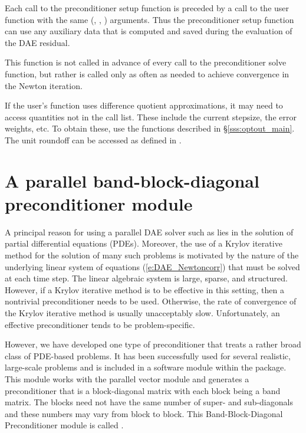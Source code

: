 {{  Each call to the preconditioner setup function is preceded by a call to the
   user function with the same (, , ) arguments.  
  Thus the preconditioner setup function can use any auxiliary data that is 
  computed and saved during the evaluation of the DAE residual.
  
  This function is not called in advance of every call to the preconditioner solve
  function, but rather is called only as often as needed to achieve convergence in
  the Newton iteration.

  If the user's  function uses difference quotient
  approximations, it may need to access quantities not in the call
  list. These include the current stepsize, the error weights, etc.
  To obtain these, use the  functions described in
  \S\ref{sss:optout_main}. The unit roundoff can be accessed
  as  defined in .

}


\section{A parallel band-block-diagonal preconditioner module}\label{sss:idabbdpre}

A principal reason for using a parallel DAE solver such as {\ida} lies
in the solution of partial differential equations (PDEs).  Moreover,
the use of a Krylov iterative method for the solution of many such
problems is motivated by the nature of the underlying linear system of
equations (\ref{e:DAE_Newtoncorr}) that must be solved at each time step.  The
linear algebraic system is large, sparse, and structured. However, if
a Krylov iterative method is to be effective in this setting, then a
nontrivial preconditioner needs to be used.  Otherwise, the rate of
convergence of the Krylov iterative method is usually unacceptably
slow.  Unfortunately, an effective preconditioner tends to be
problem-specific.

However, we have developed one type of preconditioner that treats a
rather broad class of PDE-based problems.  It has been successfully
used for several realistic, large-scale problems \cite{HiTa:98} and is
included in a software module within the {\ida} package. This module
works with the parallel vector module {\nvecp} and 
generates a preconditioner that is a block-diagonal matrix with each
block being a band matrix. The blocks need not have the same number of
super- and sub-diagonals and these numbers may vary from block to
block. This Band-Block-Diagonal Preconditioner module is called
{\idabbdpre}.

}
